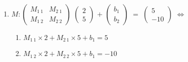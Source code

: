 \begin{enumerate}
			\item $M : \left( \begin{array}{cc}
			M_{1 \ 1} & M_{2 \ 1} \\
			M_{1 \ 2} & M_{2 \ 2}
			\end{array} \right)$
			$\left( \begin{array}{c}
			2 \\
			5
			\end{array} \right)$ $+$
			$\left( \begin{array}{c}
			b_1 \\
			b_2
			\end{array} \right)$ $=$
			$\left( \begin{array}{c}
			5 \\
			-10 
			\end{array} \right)$ $\Longleftrightarrow$
			\begin{enumerate}
				\item $M_{1 \ 1} \times 2 + M_{2 \ 1} \times 5 + b_1 = 5$
				\item $M_{1 \ 2} \times 2 + M_{2 \ 2} \times 5 + b_1 = -10$
			\end{enumerate}
			

\end{enumerate}

